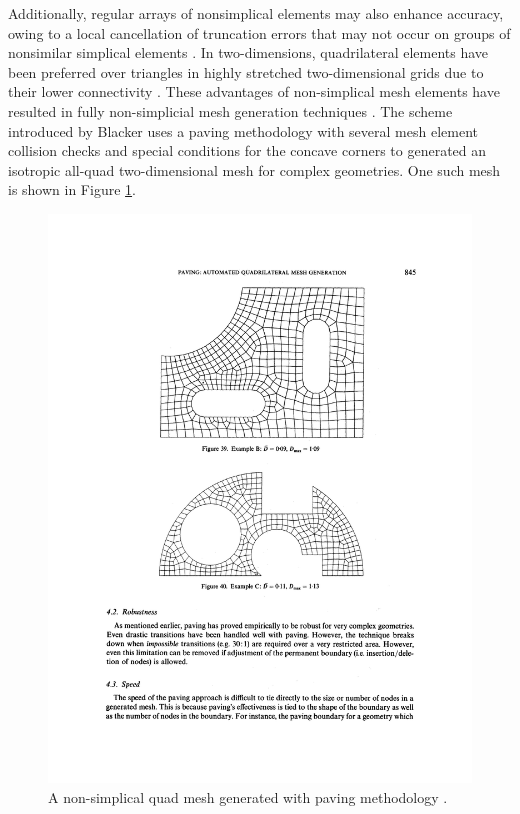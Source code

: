 Additionally, regular arrays of nonsimplical elements may also enhance accuracy, owing to a local cancellation of truncation errors that may not occur on groups of nonsimilar simplical elements \cite{mavriplis1997unstructured}. In two-dimensions, quadrilateral elements have been preferred over triangles in highly stretched two-dimensional grids due to their lower connectivity \cite{aftosmis1994accuracy}. These advantages of non-simplical mesh elements have resulted in fully non-simplicial mesh generation techniques \cite{blacker1991paving, zhu1991new}. The scheme introduced by Blacker \etal \cite{blacker1991paving} uses a paving methodology with several mesh element collision checks and special conditions for the concave corners to generated an isotropic all-quad two-dimensional mesh for complex geometries. One such mesh is shown in Figure \ref{fig-quadMesh}.

\begin{figure}
	\centering
	\includegraphics[trim={0 65.5cm 0 14cm },clip,width=\linewidth]{img/intro/lit/quadMesh.png}
	\caption{A non-simplical quad mesh generated with paving methodology \cite{blacker1991paving}.}
	\label{fig-quadMesh}
\end{figure}

